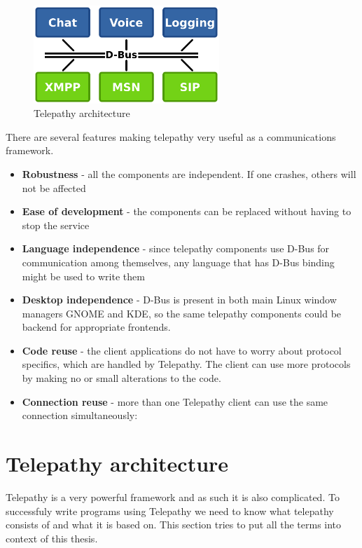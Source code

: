 \begin{figure}[ht]
\begin{center}
	\includegraphics[width=7cm]{fig/telepathy-architecture-overview.png}
	\caption{Telepathy architecture \cite{TPWiki}}
	\label{fig:telepathyArchitecture}
\end{center}
\end{figure}


There are several features making telepathy very useful as a communications framework.

\begin{itemize}

	\item {\bf Robustness} - all the components are independent. If one crashes, others will not be affected

	\item {\bf Ease of development} - the components can be replaced without having to stop the service 

	\item {\bf Language independence} - since telepathy components use D-Bus for communication among themselves, any language that has D-Bus binding might be used to write them

	\item {\bf Desktop independence} - D-Bus is present in both main Linux window managers GNOME and KDE, so the same telepathy components could be backend for appropriate frontends.

	\item {\bf Code reuse} - the client applications do not have to worry about protocol specifics, which are handled by Telepathy. The client can use more protocols by making no or small alterations to the code.

	\item {\bf Connection reuse} - more than one Telepathy client can use the same connection simultaneously:
\end{itemize}

\section{Telepathy architecture}
Telepathy is a very powerful framework and as such it is also complicated. To successfuly write programs using Telepathy we need to know what telepathy consists of and what it is based on. This section tries to put all the terms into context of this thesis.  

